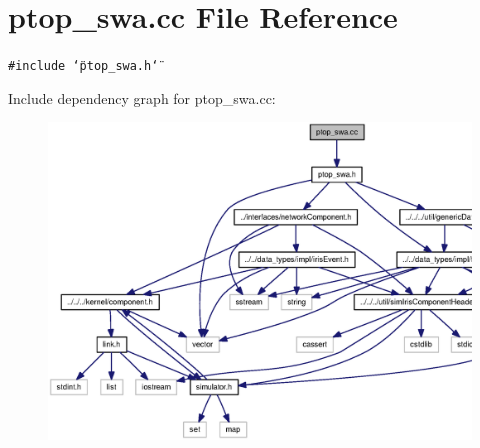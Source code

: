 \section{ptop\_\-swa.cc File Reference}
\label{ptop__swa_8cc}
{\tt \#include \char`\"{}ptop\_\-swa.h\char`\"{}}\par


Include dependency graph for ptop\_\-swa.cc:\nopagebreak
\begin{figure}[H]
\begin{center}
\leavevmode
\includegraphics[width=361pt]{ptop__swa_8cc__incl}
\end{center}
\end{figure}
